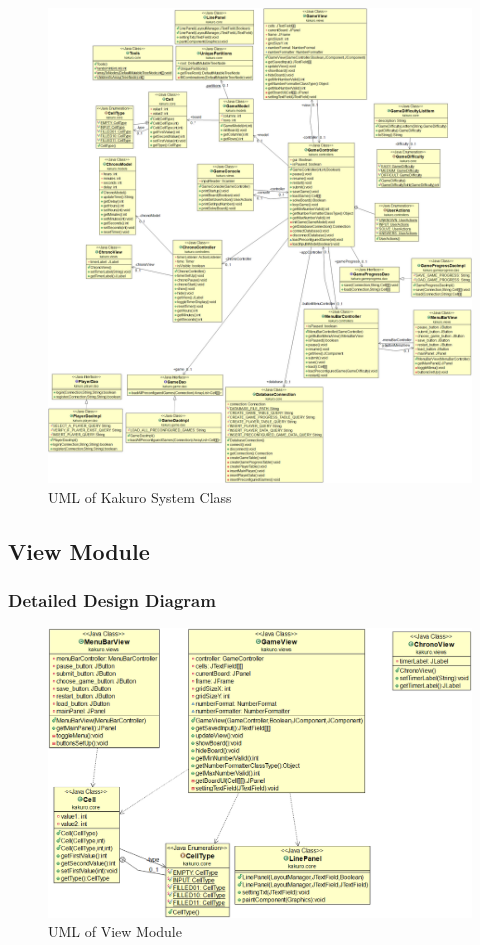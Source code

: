 \documentclass[12pt]{article}
\begin{document}
\begin{figure}[htbp]
    \includegraphics[width=1\textwidth]{Class_UML}
    \caption{UML of Kakuro System Class}
    \label{fig:Class_UML}
\end{figure}

\newpage

\subsection{View Module}

\subsubsection{Detailed Design Diagram}

\begin{figure}[htbp]
    \includegraphics[width=1\textwidth]{images/View_UML.png}
    \caption{UML of View Module}
    \label{fig:View_UML}
\end{figure}
\end{document}
